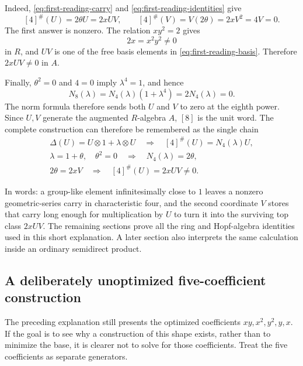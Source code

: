 \documentclass[11pt]{article}
\theoremstyle{remark}
\newcommand{\ot}{\otimes}
\begin{document}
Indeed, \eqref{eq:first-reading-carry} and
\eqref{eq:first-reading-identities} give
\begin{equation}\label{eq:first-reading-fourth}
 [4]^\#(U)=2\theta U=2xUV,
 \qquad
 [4]^\#(V)=V(2\theta)=2xV^2=4V=0.
\end{equation}
The first answer is nonzero.  The relation $xy^2=2$ gives
\[
 2x=x^2y^2\ne0
\]
in $R$, and $UV$ is one of the free basis elements in
\eqref{eq:first-reading-basis}.  Therefore $2xUV\ne0$ in $A$.

Finally, $\theta^2=0$ and $4=0$ imply $\lambda^4=1$, and hence
\[
 N_8(\lambda)
 =N_4(\lambda)(1+\lambda^4)
 =2N_4(\lambda)=0.
\]
The norm formula therefore sends both $U$ and $V$ to zero at the eighth
power.  Since $U,V$ generate the augmented $R$-algebra $A$, $[8]$ is the
unit word.  The complete construction can therefore be
remembered as the single chain
\begin{equation}\label{eq:first-reading-box}
 \boxed{
 \begin{gathered}
 \Delta(U)=U\ot1+\lambda\ot U
 \quad\Longrightarrow\quad
 [4]^\#(U)=N_4(\lambda)U,\\
 \lambda=1+\theta,\quad\theta^2=0
 \quad\Longrightarrow\quad N_4(\lambda)=2\theta,\\
 2\theta=2xV
 \quad\Longrightarrow\quad [4]^\#(U)=2xUV\ne0.
 \end{gathered}}
\end{equation}

In words: a group-like element infinitesimally close to $1$ leaves a
nonzero geometric-series carry in characteristic four, and the second
coordinate $V$ stores that carry long enough for multiplication by $U$ to
turn it into the surviving top class $2xUV$.  The remaining sections prove
all the ring and Hopf-algebra identities used in this short explanation.  A
later section also interprets the same calculation inside an ordinary
semidirect product.

\subsection*{A deliberately unoptimized five-coefficient construction}

The preceding explanation still presents the optimized coefficients
$xy,x^2,y^2,y,x$.  If the goal is to see why a construction of this shape
exists, rather than to minimize the base, it is clearer not to solve for
those coefficients.  Treat the five coefficients as separate generators.
\end{document}
